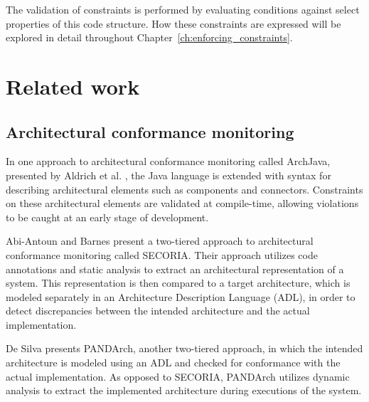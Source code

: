 The validation of constraints is performed by evaluating conditions against select properties of this code structure. How these constraints are expressed will be explored in detail throughout Chapter~\ref{ch:enforcing_constraints}.

\newpage





\section{Related work}

\subsection{Architectural conformance monitoring}

In one approach to architectural conformance monitoring called ArchJava, presented by Aldrich et al. \cite{aldrich_archjava_2002}, the Java language is extended with syntax for describing architectural elements such as components and connectors. Constraints on these architectural elements are validated at compile-time, allowing violations to be caught at an early stage of development.

Abi-Antoun and Barnes \cite{abi-antoun_analyzing_2010} present a two-tiered approach to architectural conformance monitoring called SECORIA. Their approach utilizes code annotations and static analysis to extract an architectural representation of a system. This representation is then compared to a target architecture, which is modeled separately in an Architecture Description Language (ADL), in order to detect discrepancies between the intended architecture and the actual implementation.

De Silva \cite{de_silva_towards_2014} presents PANDArch, another two-tiered approach, in which the intended architecture is modeled using an ADL and checked for conformance with the actual implementation. As opposed to SECORIA, PANDArch utilizes dynamic analysis to extract the implemented architecture during executions of the system. 

